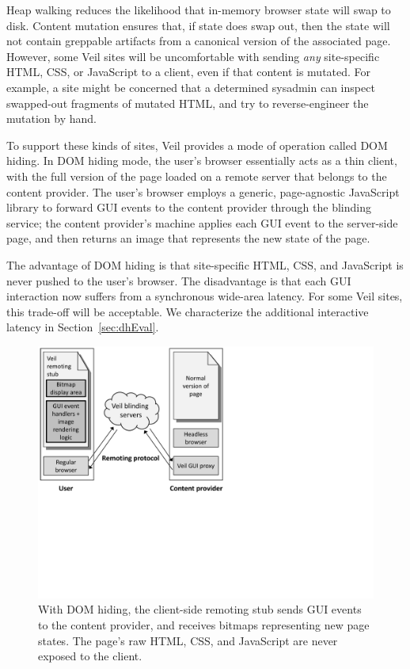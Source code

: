 \label{sec:domHiding}

Heap walking reduces the likelihood that in-memory browser
state will swap to disk. Content mutation ensures that, if
state does swap out, then the state will not contain greppable
artifacts from a canonical version of the associated page.
However, some Veil sites will be uncomfortable with sending
\emph{any} site-specific HTML, CSS, or JavaScript to a client,
even if that content is mutated. For example, a site might
be concerned that a determined sysadmin can inspect swapped-out
fragments of mutated HTML, and try to reverse-engineer the
mutation by hand.

To support these kinds of sites, Veil provides a mode of
operation called DOM hiding. In DOM hiding mode, the user's
browser essentially acts as a thin client, with the full
version of the page loaded on a remote server that belongs
to the content provider. The user's browser employs a generic,
page-agnostic JavaScript library to forward GUI events to
the content provider through the blinding service; the content
provider's machine applies each GUI event to the server-side
page, and then returns an image that represents the new state
of the page.

The advantage of DOM hiding is that site-specific HTML, CSS,
and JavaScript is never pushed to the user's browser. The
disadvantage is that each GUI interaction now suffers from
a synchronous wide-area latency. For some Veil sites,
this trade-off will be acceptable. We characterize the
additional interactive latency in Section~\ref{sec:dhEval}.

\begin{figure}[t!]
	\centering
	\includegraphics{veil-figs/domHiding.pdf}
	\caption{With DOM hiding, the client-side remoting stub sends
		GUI events to the content provider, and receives bitmaps
		representing new page states. The page's raw HTML, CSS,
		and JavaScript are never exposed to the client.}
	\label{fig:domHiding}
\end{figure}

